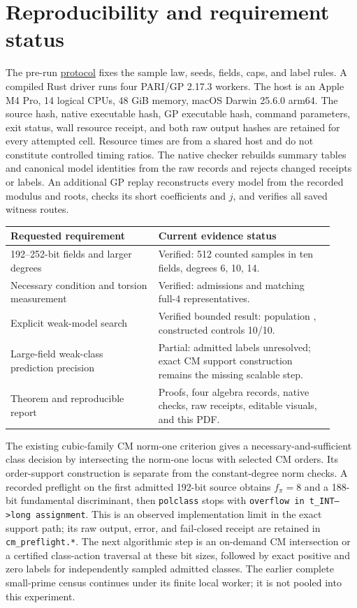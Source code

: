 \documentclass[11pt]{article}
\begin{document}
\section{Reproducibility and requirement status}
The pre-run \href{PROTOCOL.md}{protocol} fixes the sample law, seeds,
fields, caps, and label rules. A compiled Rust driver runs four PARI/GP
2.17.3 workers. The host is an Apple M4 Pro, 14 logical CPUs, 48 GiB
memory, macOS Darwin 25.6.0 arm64. The source hash, native executable hash,
GP executable hash, command parameters, exit status, wall resource receipt,
and both raw output hashes are retained for every attempted cell. Resource
times are from a shared host and do not constitute controlled timing ratios.
The native checker rebuilds summary tables and canonical model identities
from the raw records and rejects changed receipts or labels. An additional
GP replay reconstructs every model from the recorded modulus and roots,
checks its short coefficients and $j$, and verifies all saved witness routes.

\begin{center}
\begin{tabular}{p{0.42\linewidth}p{0.50\linewidth}}
\toprule
Requested requirement & Current evidence status\\
\midrule
192--252-bit fields and larger degrees & Verified: 512 counted samples in ten fields, degrees 6, 10, 14.\\
Necessary condition and torsion measurement & Verified: \TotalAdmitted{} admissions and matching full-4 representatives.\\
Explicit weak-model search & Verified bounded result: population \TotalWitnesses{}, constructed controls 10/10.\\
Large-field weak-class prediction precision & Partial: \TotalUnresolved{} admitted labels unresolved; exact CM support construction remains the missing scalable step.\\
Theorem and reproducible report & Proofs, four algebra records, native checks, raw receipts, editable visuals, and this PDF.\\
\bottomrule
\end{tabular}
\end{center}
The existing cubic-family CM norm-one criterion gives a necessary-and-sufficient
class decision by intersecting the norm-one locus with selected CM orders.
Its order-support construction is separate from the constant-degree norm
checks. A recorded preflight on the first admitted 192-bit source obtains
$f_\pi=8$ and a 188-bit fundamental discriminant, then \texttt{polclass}
stops with \texttt{overflow in t\_INT-->long assignment}. This is an
observed implementation limit in the exact support path; its raw output,
error, and fail-closed receipt are retained in \texttt{cm\_preflight.*}.
The next algorithmic step is an on-demand CM intersection or a
certified class-action traversal at these bit sizes, followed by exact
positive and zero labels for independently sampled admitted classes.
The earlier complete small-prime census continues under its finite local
worker; it is not pooled into this experiment.
\end{document}
